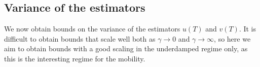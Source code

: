 \documentclass[11pt,a4paper]{article}
\newcommand{\e}{\mathrm{e}}
\newcommand{\vect}[1]{\boldsymbol{\mathbf #1}}
\renewcommand{\d}{\mathrm d}
\theoremstyle{plain}
\newtheorem{remark}{Remark}[section]
\numberwithin{equation}{section}
\renewcommand{\leq}{\leqslant}
\renewcommand{\geq}{\geqslant}
\begin{document}

\subsection{Variance of the estimators}%
We now obtain bounds on the variance of the estimators $u(T)$ and $v(T)$.
It is difficult to obtain bounds that scale well both as $\gamma \to 0$ and $\gamma \to \infty$,
so here we aim to obtain bounds with a good scaling in the underdamped regime only,
as this is the interesting regime for the mobility.
\end{document}
